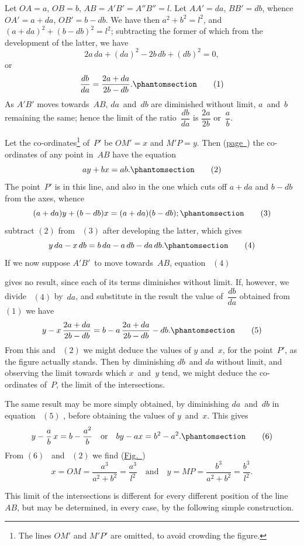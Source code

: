 \documentclass[12pt]{book}[2005/09/16]
\newcommand{\Chg}[2]{#2}
\newcommand{\Add}[1]{\Chg{}{#1}}
\newcounter{SecNo}
\newcommand{\Fig}[2][Fig.]{\hyperref[fig:#2]{#1~{\upshape #2}}}
\newcommand{\Pagelabel}[1]{\phantomsection\label{page:#1}}
\newcommand{\PageSep}[1]{\Pagelabel{#1}\ignorespaces}
\newcommand{\PageRef}[2][page]{\hyperref[page:#2]{#1~\pageref*{page:#2}}}
\renewcommand{\(}{{\upshape(}}
\renewcommand{\)}{{\upshape)}}
\newcommand{\Tag}[1]{%
  \phantomsection\label{eqn:\theSecNo.#1}\tag*{\ensuremath{#1}}%
}
\newcommand{\Eq}[2][\theSecNo]{%
  \hyperref[eqn:#1.#2]{\ensuremath{#2}}%
}
\begin{document}
Let $OA = a$, $OB = b$, $AB = A'B' = A''B'' = l$. Let
$AA' = da$, $BB' = db$, whence $OA' = a + da$, $OB' = b - db$.
We have then $a^{2} + b^{2} = l^{2}$, and $(a + da)^{2} + (b - db)^{2} = l^{2}$;
subtracting the former of which from
the development of the latter, we have
\[
2a\, da + (da)^{2} - 2b\, db + (db)^{2} = 0\Add{,}
\]
or
\[
\frac{db}{da} = \frac{2a + da}{2b - db}\Add{.}
\Tag{(1)}
\]
As $A'B'$ moves towards~$AB$, $da$~and~$db$ are diminished
without limit, $a$~and~$b$ remaining the same; hence the
limit of the ratio~$\dfrac{db}{da}$ is $\dfrac{2a}{2b}$ or~$\dfrac{a}{b}$.
\PageSep{47}

Let the co-ordinates\footnote
  {The lines $OM'$ and $M'P'$ are omitted, to avoid crowding the figure.}
of~$P'$ be $OM' = x$ and $M'P = y$.
Then (\PageRef{32}) the co-ordinates of any point in~$AB$
have the equation
\[
ay + bx = ab\Add{.}
\Tag{(2)}
\]
The point~$P'$ is in this line, and also in the one which
cuts off $a + da$ and $b - db$ from the axes, whence
\[
(a + da)y + (b - db)x = (a + da)(b - db)\Add{;}
\Tag{(3)}
\]
subtract \Eq{(2)} from~\Eq{(3)} after developing the latter, which
gives
\[
y\, da - x\, db = b\, da - a\, db - da\, db\Add{.}
\Tag{(4)}
\]
If we now suppose $A'B'$~to move towards~$AB$, equation~\Eq{(4)}
gives no result, since each of its terms diminishes
without limit. If, however, we divide~\Eq{(4)} by~$da$,
and substitute in the result the value of~$\dfrac{db}{da}$ obtained
from~\Eq{(1)} we have
\[
y - x\, \frac{2a + da}{2b - db}
 = b - a\, \frac{2a + da}{2b - db} - db\Add{.}
\Tag{(5)}
\]
From this and~\Eq{(2)} we might deduce the values of $y$
and~$x$, for the point~$P'$, as the figure actually stands.
Then by diminishing $db$~and $da$ without limit, and
observing the limit towards which $x$~and~$y$ tend, we
might deduce the co-ordinates of~$P$, the limit of the
intersections.

The same result may be more simply obtained, by
diminishing $da$~and~$db$ in equation~\Eq{(5)}, before obtaining
the values of $y$~and~$x$. This gives
\[
y - \frac{a}{b}\, x = b - \frac{a^{2}}{b} \quad\text{or}\quad
by - ax = b^{2} - a^{2}\Add{.}
\Tag{(6)}
\]
From \Eq{(6)}~and~\Eq{(2)} we find (\Fig{6})
\[
x = OM = \frac{a^{3}}{a^{2} + b^{2}} = \frac{a^{3}}{l^{2}} \quad\text{and}\quad
y = MP = \frac{b^{3}}{a^{2} + b^{2}} = \frac{b^{3}}{l^{2}}.
\]
\PageSep{48}

This limit of the intersections is different for every
different position of the line~$AB$, but may be determined,
in every case, by the following simple construction.
\end{document}
